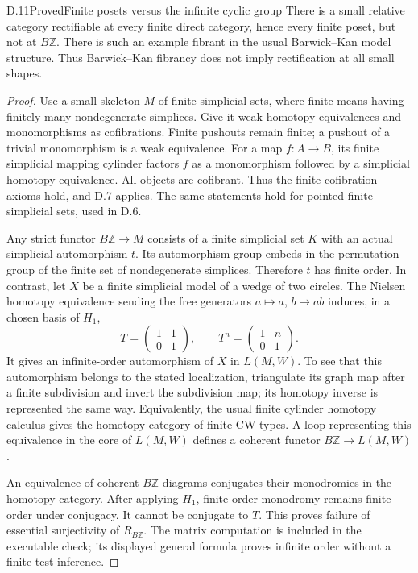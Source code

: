 \begin{result}{D.11}{Proved}{Finite posets versus the infinite cyclic group}
There is a small relative category rectifiable at every finite direct
category, hence every finite poset, but not at $B\mathbb Z$.
There is such an example fibrant in the usual Barwick--Kan model
structure. Thus Barwick--Kan fibrancy does not imply rectification at
all small shapes.
\end{result}
\begin{proof}
Use a small skeleton $M$ of finite simplicial sets, where finite means
having finitely many nondegenerate simplices. Give it weak homotopy
equivalences and monomorphisms as cofibrations. Finite pushouts remain
finite; a pushout of a trivial monomorphism is a weak equivalence.
For a map $f:A\to B$, its finite simplicial mapping cylinder factors
$f$ as a monomorphism followed by a simplicial homotopy equivalence.
All objects are cofibrant. Thus the finite cofibration axioms hold,
and D.7 applies. The same statements hold for pointed finite
simplicial sets, used in D.6.

Any strict functor $B\mathbb Z\to M$ consists of a finite simplicial
set $K$ with an actual simplicial automorphism $t$. Its automorphism
group embeds in the permutation group of the finite set of
nondegenerate simplices. Therefore $t$ has finite order. In contrast,
let $X$ be a finite simplicial model of a wedge of two circles.
The Nielsen homotopy equivalence sending the free generators
$a\mapsto a$, $b\mapsto ab$ induces, in a chosen basis of $H_1$,
\[
 T=\begin{pmatrix}1&1\\0&1\end{pmatrix},\qquad
 T^n=\begin{pmatrix}1&n\\0&1\end{pmatrix}.
\]
It gives an infinite-order automorphism of $X$ in $L(M,W)$.
To see that this automorphism belongs to the stated localization,
triangulate its graph map after a finite subdivision and invert the
subdivision map; its homotopy inverse is represented the same way.
Equivalently, the usual finite cylinder homotopy calculus gives the
homotopy category of finite CW types. A loop representing this
equivalence in the core of $L(M,W)$ defines a coherent functor
$B\mathbb Z\to L(M,W)$.

An equivalence of coherent $B\mathbb Z$-diagrams conjugates their
monodromies in the homotopy category. After applying $H_1$, finite-order
monodromy remains finite order under conjugacy. It cannot be conjugate
to $T$. This proves failure of essential surjectivity of $R_{B\mathbb Z}$.
The matrix computation is included in the executable check; its
displayed general formula proves infinite order without a finite-test
inference.


\end{proof}
